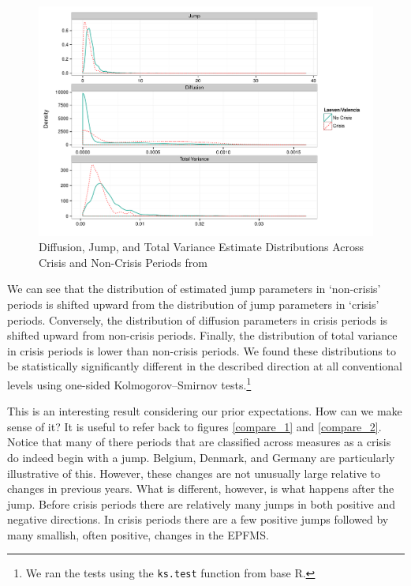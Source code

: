 \documentclass[]{article}
\begin{document}
\begin{figure}
    \caption{Diffusion, Jump, and Total Variance Estimate Distributions Across Crisis and Non-Crisis Periods from \cite{laeven2013}}
    \label{comp_jump_diff}
    \begin{center}
        \includegraphics[scale=0.5]{analysis/figures/compare_jump_diffusion_basic.pdf}
    \end{center}
\end{figure}

We can see that the distribution of estimated jump parameters in `non-crisis' periods is shifted upward from the distribution of jump parameters in `crisis' periods. Conversely, the distribution of diffusion parameters in crisis periods is shifted upward from non-crisis periods. Finally, the distribution of total variance in crisis periods is lower than non-crisis periods. We found these distributions to be statistically significantly different in the described direction at all conventional levels using one-sided Kolmogorov–Smirnov tests.\footnote{We ran the tests using the \texttt{ks.test} function from base R.}

This is an interesting result considering our prior expectations. How can we make sense of it? It is useful to refer back to figures \ref{compare_1} and \ref{compare_2}. Notice that many of there periods that are classified across measures as a crisis do indeed begin with a jump. Belgium, Denmark, and Germany are particularly illustrative of this. However, these changes are not unusually large relative to changes in previous years. What is different, however, is what happens after the jump. Before crisis periods there are relatively many jumps in both positive and negative directions. In crisis periods there are a few positive jumps followed by many smallish, often positive, changes in the EPFMS.
\end{document}
